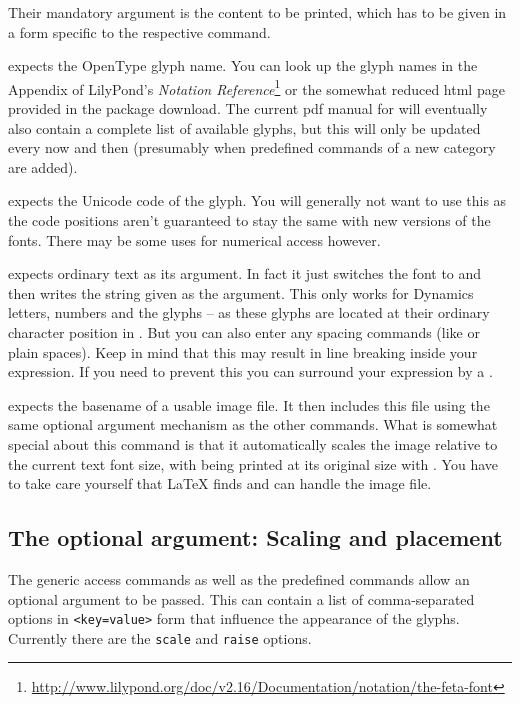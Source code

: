 \documentclass{article}
\begin{document}
Their mandatory argument is the content to be printed, which has to be given in a form specific to the respective command.

\medskip
{} expects the OpenType glyph name. 
You can look up the glyph names in the Appendix of LilyPond's \emph{Notation Reference}\footnote{\url{http://www.lilypond.org/doc/v2.16/Documentation/notation/the-feta-font}} or the somewhat reduced html page provided in the package download. 
The current pdf manual for \lilyglyphs will eventually also contain a complete list of available glyphs, but this will only be updated every now and then (presumably when predefined commands of a new category are added).

\medskip
{} expects the Unicode code of the glyph. 
You will generally not want to use this as the code positions aren't guaranteed to stay the same with new versions of the fonts. 
There may be some uses for numerical access however.

\medskip
{} expects ordinary text as its argument. 
In fact it just switches the font to \emmentaler and then writes the string given as the argument. 
This only works for Dynamics letters, numbers and the glyphs  -- as these glyphs are located at their ordinary character position in \emmentaler. 
But you can also enter any spacing commands (like  or plain spaces). 
Keep in mind that this may result in line breaking inside your expression. 
If you need to prevent this you can surround your expression by a .

\medskip
{} expects the basename of a usable image file.
It then includes this file using the same optional argument mechanism as the other commands.
What is somewhat special about this command is that it automatically scales the image relative to the current text font size, with being printed at its original size with .
You have to take care yourself that \LaTeX{} finds and can handle the image file.


\subsection{The optional argument: Scaling and placement}
\label{subsec:optional_argument}
The generic access commands as well as the predefined commands allow an optional argument to be passed.
This can contain a list of comma-separated options in \texttt{<key=value>} form that influence the appearance of the glyphs. Currently there are the \texttt{scale} and \texttt{raise} options.
\end{document}
